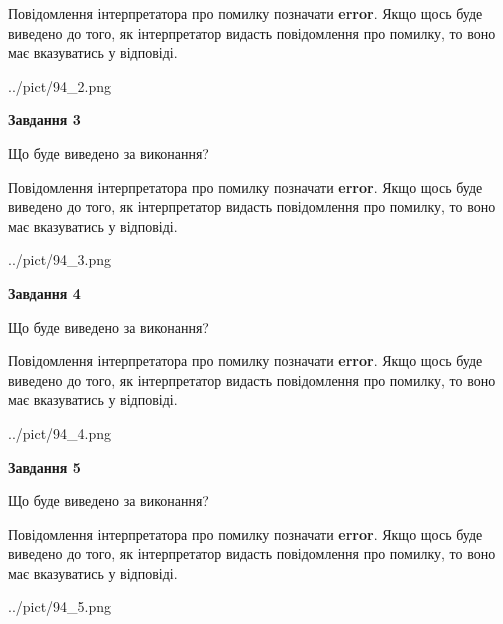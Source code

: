 \documentclass[12pt, ukrainian]{article}
\begin{document}
{\begin {large}
Повідомлення інтерпретатора про помилку позначати \textbf{error}.
Якщо щось буде виведено до того, як інтерпретатор видасть повідомлення про помилку, 
то воно має вказуватись у відповіді. \par


\begin{center}
	{../pict/94_2.png}
\end{center}
\newpage

{\begin {center}\textbf{Завдання 3}\end {center}}\par
Що буде виведено за виконання?

Повідомлення інтерпретатора про помилку позначати \textbf{error}.
Якщо щось буде виведено до того, як інтерпретатор видасть повідомлення про помилку, 
то воно має вказуватись у відповіді. \par


\begin{center}
	{../pict/94_3.png}
\end{center}
\newpage

{\begin {center}\textbf{Завдання 4}\end {center}}\par
Що буде виведено за виконання?

Повідомлення інтерпретатора про помилку позначати \textbf{error}.
Якщо щось буде виведено до того, як інтерпретатор видасть повідомлення про помилку, 
то воно має вказуватись у відповіді. \par


\begin{center}
	{../pict/94_4.png}
\end{center}
\newpage

{\begin {center}\textbf{Завдання 5}\end {center}}\par
Що буде виведено за виконання?

Повідомлення інтерпретатора про помилку позначати \textbf{error}.
Якщо щось буде виведено до того, як інтерпретатор видасть повідомлення про помилку, 
то воно має вказуватись у відповіді. \par


\begin{center}
	{../pict/94_5.png}
\end{center}
\newpage


\end{large}}
\end{document}
